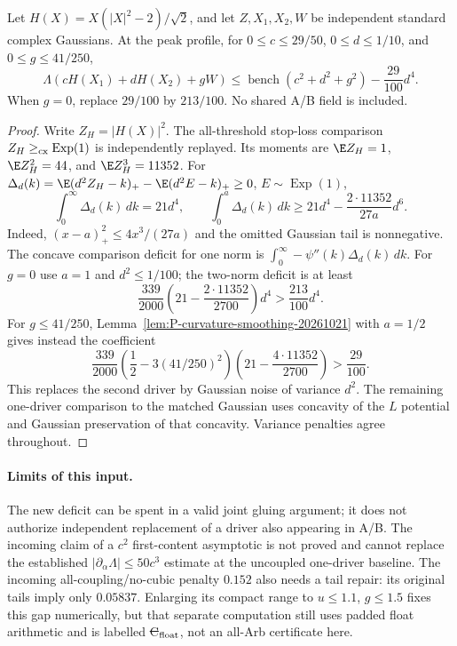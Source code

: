 \begin{proposition}
\label{prop:P-two-wick-deficit-20261021}
Let $H(X)=X(|X|^2-2)/\sqrt2$, and let $Z,X_1,X_2,W$ be independent
standard complex Gaussians. At the peak profile, for
$0\le c\le29/50$, $0\le d\le1/10$, and $0\le g\le41/250$,
\[
 \Lambda(cH(X_1)+dH(X_2)+gW)
 \le\operatorname{bench}(c^2+d^2+g^2)-\frac{29}{100}d^4.
\]
When $g=0$, replace $29/100$ by $213/100$.
No shared A/B field is included.
\end{proposition}
\begin{proof}
Write $Z_H=|H(X)|^2$. The all-threshold stop-loss comparison
$Z_H\ge_{\rm cx}\operatorname{Exp}(1)$ is independently replayed.
Its moments are $\E Z_H=1$, $\E Z_H^2=44$, and $\E Z_H^3=11352$.
For
$\Delta_d(k)=\E(d^2Z_H-k)_+-\E(d^2E-k)_+\ge0$, $E\sim\operatorname{Exp}(1)$,
\[
 \int_0^\infty\Delta_d(k)\,dk=21d^4,\qquad
 \int_0^a\Delta_d(k)\,dk
 \ge21d^4-\frac{2\cdot11352}{27a}d^6.
\]
Indeed, $(x-a)_+^2\le4x^3/(27a)$ and the omitted Gaussian tail is
nonnegative. The concave comparison deficit for one norm is
$\int_0^\infty-\psi''(k)\Delta_d(k)\,dk$.
For $g=0$ use $a=1$ and $d^2\le1/100$; the two-norm deficit is at least
\[
 \frac{339}{2000}\left(21-\frac{2\cdot11352}{2700}\right)d^4
 >\frac{213}{100}d^4.
\]
For $g\le41/250$, Lemma~\ref{lem:P-curvature-smoothing-20261021}
with $a=1/2$ gives instead the coefficient
\[
 \frac{339}{2000}\left(\frac12-3(41/250)^2\right)
 \left(21-\frac{4\cdot11352}{2700}\right)>\frac{29}{100}.
\]
This replaces the second driver by Gaussian noise of variance $d^2$.
The remaining one-driver comparison to the matched Gaussian uses
concavity of the $L$ potential and Gaussian preservation of that
concavity. Variance penalties agree throughout.
\end{proof}

\paragraph{Limits of this input.}
The new deficit can be spent in a valid joint gluing argument; it does
not authorize independent replacement of a driver also appearing in
A/B. The incoming claim of a $c^2$ first-content asymptotic is not
proved and cannot replace the established $|\partial_\alpha\Lambda|
\le50c^3$ estimate at the uncoupled one-driver baseline.
The incoming all-coupling/no-cubic penalty $0.152$ also needs a tail
repair: its original tails imply only $0.05837$. Enlarging its compact
range to $u\le1.1$, $g\le1.5$ fixes this gap numerically, but that
separate computation still uses padded float arithmetic and is
labelled \st{C$_{\rm float}$}, not an all-Arb certificate here.
